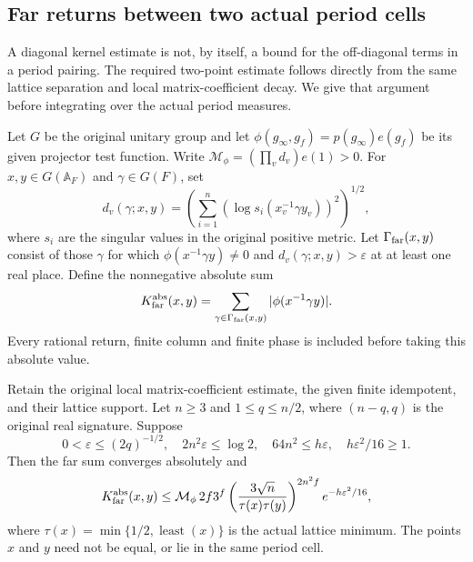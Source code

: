 \subsection{Far returns between two actual period cells}
\label{global-gram-two-point-far-section}

A diagonal kernel estimate is not, by itself, a bound for the
off-diagonal terms in a period pairing.  The required two-point
estimate follows directly from the same lattice separation and
local matrix-coefficient decay.  We give that argument before
integrating over the actual period measures.

Let $G$ be the original unitary group and let
$\phi(g_\infty,g_f)=p(g_\infty)e(g_f)$ be its given projector
test function.  Write
$\mathcal M_\phi=(\prod_vd_v)e(1)>0$.
For $x,y\in G(\mathbb A_F)$ and $\gamma\in G(F)$, set
\[
 d_v(\gamma;x,y)=
 \left(\sum_{i=1}^n(\log s_i(x_v^{-1}\gamma y_v))^2\right)^{1/2},
\]
where $s_i$ are the singular values in the original positive metric.
Let $\Gamma_{\rm far}(x,y)$ consist of those $\gamma$ for which
$\phi(x^{-1}\gamma y)\ne0$ and $d_v(\gamma;x,y)>\varepsilon$
at at least one real place.  Define the nonnegative absolute sum
\[
 K^{\rm abs}_{\rm far}(x,y)
  =\sum_{\gamma\in\Gamma_{\rm far}(x,y)}
                         |\phi(x^{-1}\gamma y)|.
\]
Every rational return, finite column and finite phase is included
before taking this absolute value.

\begin{lemma}
\label{global-gram-two-point-far}
Retain the original local matrix-coefficient estimate, the given
finite idempotent, and their lattice support.  Let $n\geq3$ and
$1\leq q\leq n/2$, where $(n-q,q)$ is the original real
signature.  Suppose
\[
 0<\varepsilon\leq(2q)^{-1/2},\quad
 2n^2\varepsilon\leq\log2,\quad
 64n^2\leq h\varepsilon,\quad
 h\varepsilon^2/16\geq1.
\]
Then the far sum converges absolutely and
\begin{equation}\label{global-gram-two-point-far-bound}
 K^{\rm abs}_{\rm far}(x,y)
 \leq\mathcal M_\phi\,2f3^f
 \left(\frac{3\sqrt n}{\tau(x)\tau(y)}\right)^{2n^2f}
                           e^{-h\varepsilon^2/16},
\end{equation}
where $\tau(x)=\min\{1/2,\operatorname{least}(x)\}$ is the
actual lattice minimum.  The points $x$ and $y$ need not be equal,
or lie in the same period cell.
\end{lemma}

